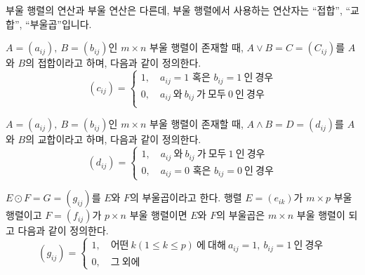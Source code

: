 \begin{flushleft}
    부울 행렬의 연산과 부울 연산은 다른데, 부울 행렬에서 사용하는 연산자는 “접합”, “교합”, “부울곱”입니다.
\end{flushleft}

\begin{tcolorbox}[colback = white, colframe = Definition, title = \textmd{정의: 접합}]
    $A = (a_{ij}), \ B = (b_{ij})$인 $m \times n$ 부울 행렬이 존재할 때,
    $A \vee B = C = (C_{ij})$를 $A$와 $B$의 접합이라고 하며, 다음과 같이 정의한다.
    \[ (c_{ij}) =  
    \begin{cases}
        1, \quad a_{ij}= 1 \text{ 혹은 } b_{ij} = 1 \ 인 \ 경우  \\
        0, \quad a_{ij} \ 와 \ b_{ij} \ 가 \ 모두 \ 0 \ 인 \ 경우 \\
    \end{cases} \]
\end{tcolorbox}

\begin{tcolorbox}[colback = white, colframe = Definition, title = \textmd{정의: 교합}]
    $A = (a_{ij}), \ B = (b_{ij})$인 $m \times n$ 부울 행렬이 존재할 때,
    $A \wedge B = D = (d_{ij})$를 $A$와 $B$의 교합이라고 하며, 다음과 같이 정의한다.
    \[ (d_{ij}) =  
    \begin{cases}
        1, \quad a_{ij} \ 와 \ b_{ij} \ 가 \ 모두 \ 1 \ 인 \ 경우 \\
        0, \quad a_{ij}= 0 \text{ 혹은 } b_{ij} = 0 \ 인 \ 경우
    \end{cases} \]
\end{tcolorbox}

\begin{tcolorbox}[colback = white, colframe = Definition, title = \textmd{정의: 부울곱}]
    $E \odot F = G = (g_{ij})$를 $E$와 $F$의 부울곱이라고 한다. 행렬 $E = (e_{ik})$가 $m \times p$ 부울 행렬이고 
    $F = (f_{ij})$가 $p \times n$ 부울 행렬이면 $E$와 $F$의 부울곱은 $m\times n$ 부울 행렬이 되고 다음과 같이 정의한다.
    \[ (g_{ij}) =  
    \begin{cases}
        1, \quad 어떤 \ k(1 \leq k \leq p) \ 에 \ 대해  \ a_{ij}= 1,\ b_{ij} = 1 \ 인 \ 경우  \\
        0, \quad 그 \ 외에
    \end{cases} \]
\end{tcolorbox}

